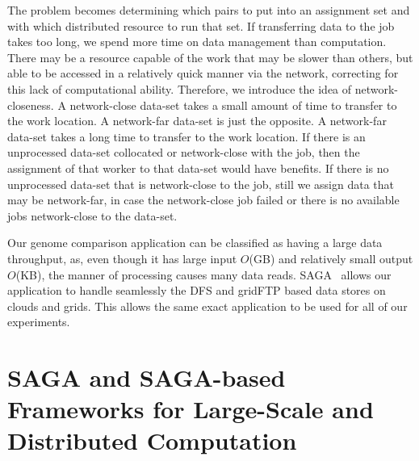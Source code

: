 \documentclass{rspublic}
\newcommand{\micnote}[1]{ {\textcolor{blue} { ***Michael: #1 }}}
\newcommand{\betynote}[1]{ {\textcolor{orange} { ***Bety: #1 }}}
\newcommand{\jhanote}[1]{} \newcommand{\micnote}[1]{}\newcommand{\betynote}[1]{} \newcommand{\fixme}[1]{}
\begin{document}
The problem becomes determining which pairs to put into an assignment set and
with which distributed resource to run that set. If transferring data to the
job takes too long, we spend more time on data management than computation.
There may be a resource capable of the work that may be slower than others,
but able to be accessed in a relatively quick manner via the network,
correcting for this lack of computational ability.  Therefore, we introduce
the idea of network-closeness. A network-close data-set takes a small amount
of time to transfer to the work location.  A network-far data-set is just the
opposite. A network-far data-set takes a long time to transfer to the work
location. If there is an unprocessed data-set collocated or network-close
with the job, then the assignment of that worker to that data-set would have
benefits. If there is no unprocessed data-set that is network-close to the
job, still we assign data that may be network-far, in case the network-close
job failed or there is no available jobs network-close to the data-set.


Our genome comparison application can be classified as having a large
data throughput, as, even though it has large input $O$(GB) and
relatively small output $O$(KB), the manner of processing causes many
data reads. SAGA~\citep{saga_url} allows our application to handle
seamlessly the DFS and gridFTP based data stores on clouds and grids.
This allows the same exact application to be used for all of our
experiments. 

\section{SAGA and SAGA-based Frameworks for Large-Scale and
  Distributed Computation}\label{Sec:SAGA}

\end{document}
